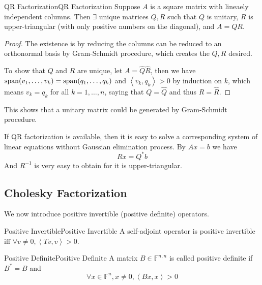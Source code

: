 \documentclass[../main.tex]{subfiles}
\begin{document}
\begin{theorem}{QR Factorization}{QR Factorization}
Suppose $A$ is a square matrix with lineaely independent columns. Then $\exists $ unique matrices $Q,R$ such that $Q$ is unitary, $R$ is upper-triangular (with only positive numbers on the diagonal), and $A=QR$.
\end{theorem}
\begin{proof}
The existence is by reducing the columns can be reduced to an orthonormal basis by Gram-Schmidt procedure, which creates the $Q,R$ desired.

To show that $Q$ and $R$ are unique, let $A = \hat{Q}\hat{R}$, then we have $\operatorname{span}(v_1, \ldots ,v_k) = \operatorname{span}(q_1, \ldots ,q_k)$ and $\left<v_k,q_k\right> >0$ by induction on $k$, which means $v_k=q_k$ for all $k=1, \ldots ,n$, saying that $Q=\hat{Q}$ and thus $R=\hat{R}$.
\end{proof}

\begin{remark}
This shows that a unitary matrix could be generated by Gram-Schmidt procedure.

If QR factorization is available, then it is easy to solve a corresponding system of linear equations without Gaussian elimination process. By  $Ax=b$ we have
\begin{equation*}
Rx=Q^*b
\end{equation*}
And $R^{-1}$ is very easy to obtain for it is upper-triangular.
\end{remark}


\subsection{Cholesky Factorization}
We now introduce positive invertible (positive definite) operators.

\begin{theorem}{Positive Invertible}{Positive Invertible}
A self-adjoint operator is positive invertible iff $\forall v\neq 0, \left<Tv,v\right> >0$.
\end{theorem}

\begin{definition}{Positive Definite}{Positive Definite}
A matrix $B\in \mathbb{F}^{n,n}$ is called positive definite if $B^*=B$ and
\begin{equation*}
\forall x\in \mathbb{F}^n,x\neq 0,\left<Bx,x\right> >0
\end{equation*}
\end{definition}
\end{document}
